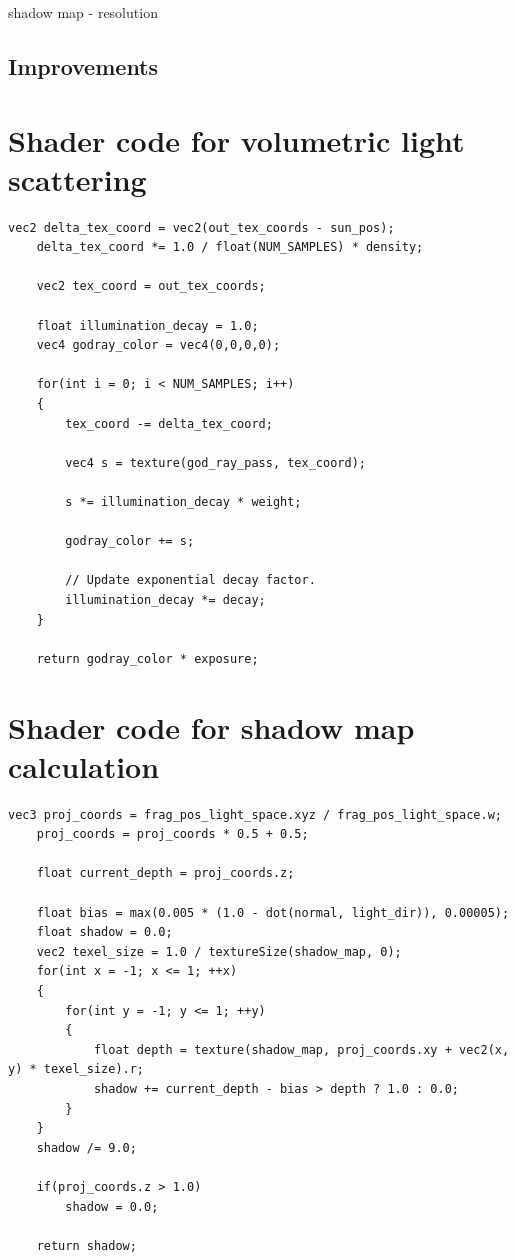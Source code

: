 \documentclass{article}
\begin{document}
  		
  		
  		
  		
  		
  		
  		
  		shadow map - resolution
  		
  	\subsection{Improvements}

	\newpage
	
	{}
	
	\newpage
	\appendix
	\section{Shader code for volumetric light scattering}
	\label{appendix:godray}
		
	\begin{lstlisting}[basicstyle=\ttfamily\footnotesize, tabsize=4]
	vec2 delta_tex_coord = vec2(out_tex_coords - sun_pos);
	delta_tex_coord *= 1.0 / float(NUM_SAMPLES) * density;
	
	vec2 tex_coord = out_tex_coords;
	
	float illumination_decay = 1.0;
	vec4 godray_color = vec4(0,0,0,0);
	
	for(int i = 0; i < NUM_SAMPLES; i++)
	{
		tex_coord -= delta_tex_coord;
		
		vec4 s = texture(god_ray_pass, tex_coord);
		
		s *= illumination_decay * weight;
		
		godray_color += s;
		
		// Update exponential decay factor.
		illumination_decay *= decay;
	}
	
	return godray_color * exposure;
	\end{lstlisting}
		
	\section{Shader code for shadow map calculation}
	\label{appendix:shadow}
		
	\begin{lstlisting}[basicstyle=\ttfamily\footnotesize, tabsize=4]
	vec3 proj_coords = frag_pos_light_space.xyz / frag_pos_light_space.w;
	proj_coords = proj_coords * 0.5 + 0.5;

	float current_depth = proj_coords.z;
	
	float bias = max(0.005 * (1.0 - dot(normal, light_dir)), 0.00005);
	float shadow = 0.0;
	vec2 texel_size = 1.0 / textureSize(shadow_map, 0);
	for(int x = -1; x <= 1; ++x)
	{
		for(int y = -1; y <= 1; ++y)
		{
			float depth = texture(shadow_map, proj_coords.xy + vec2(x, y) * texel_size).r; 
			shadow += current_depth - bias > depth ? 1.0 : 0.0;        
		}
	}
	shadow /= 9.0;
	
	if(proj_coords.z > 1.0)
		shadow = 0.0;
	
	return shadow;
		
	\end{lstlisting}
  	
\end{document}
